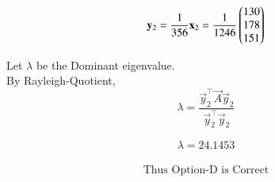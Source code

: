 \documentclass[journal]{IEEEtran}
\begin{document}
\begin{equation}
    \mathbf{y}_2 = \frac{1}{356} \mathbf{x}_2 = \frac{1}{1246}\begin{pmatrix}130 \\ 178 \\ 151\end{pmatrix}
\end{equation}

\newpage

Let $\lambda$ be the Dominant eigenvalue.\\

By Rayleigh-Quotient,
\begin{equation}
    \lambda = \dfrac{\vec{y}_2^\top\vec{A}\vec{y}_2}{\vec{y}_2^\top\vec{y}_2}
\end{equation}

\begin{align*}
    \boxed{\lambda = 24.1453}
\end{align*}

\begin{align*}
\boxed{\text{Thus Option-D is Correct}}
\end{align*}
\end{document}
